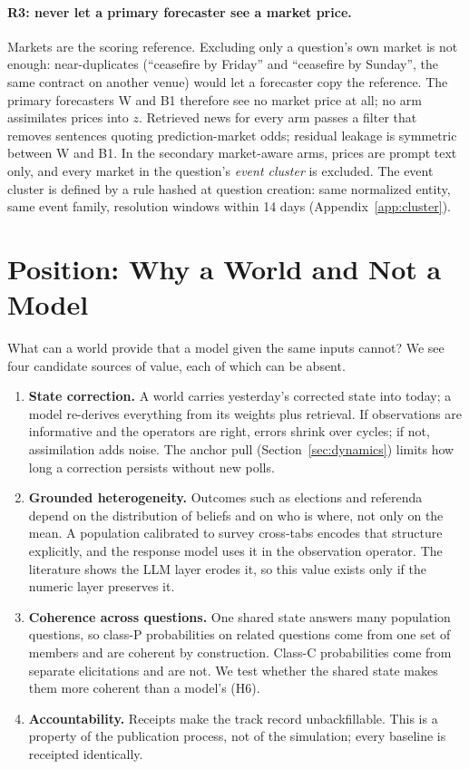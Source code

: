 \documentclass[11pt]{article}
\begin{document}
\paragraph{R3: never let a primary forecaster see a market price.} Markets are the scoring reference. Excluding only a question's own market is not enough: near-duplicates (``ceasefire by Friday'' and ``ceasefire by Sunday'', the same contract on another venue) would let a forecaster copy the reference. The primary forecasters W and B1 therefore see no market price at all; no arm assimilates prices into $z$. Retrieved news for every arm passes a filter that removes sentences quoting prediction-market odds; residual leakage is symmetric between W and B1. In the secondary market-aware arms, prices are prompt text only, and every market in the question's \emph{event cluster} is excluded. The event cluster is defined by a rule hashed at question creation: same normalized entity, same event family, resolution windows within 14 days (Appendix~\ref{app:cluster}).

\section{Position: Why a World and Not a Model}\label{sec:position}

What can a world provide that a model given the same inputs cannot? We see four candidate sources of value, each of which can be absent.

\begin{enumerate}
  \item \textbf{State correction.} A world carries yesterday's corrected state into today; a model re-derives everything from its weights plus retrieval. If observations are informative and the operators are right, errors shrink over cycles; if not, assimilation adds noise. The anchor pull (Section~\ref{sec:dynamics}) limits how long a correction persists without new polls.
  \item \textbf{Grounded heterogeneity.} Outcomes such as elections and referenda depend on the distribution of beliefs and on who is where, not only on the mean. A population calibrated to survey cross-tabs encodes that structure explicitly, and the response model uses it in the observation operator. The literature shows the LLM layer erodes it, so this value exists only if the numeric layer preserves it.
  \item \textbf{Coherence across questions.} One shared state answers many population questions, so class-P probabilities on related questions come from one set of members and are coherent by construction. Class-C probabilities come from separate elicitations and are not. We test whether the shared state makes them more coherent than a model's (H6).
  \item \textbf{Accountability.} Receipts make the track record unbackfillable. This is a property of the publication process, not of the simulation; every baseline is receipted identically.
\end{enumerate}
\end{document}

